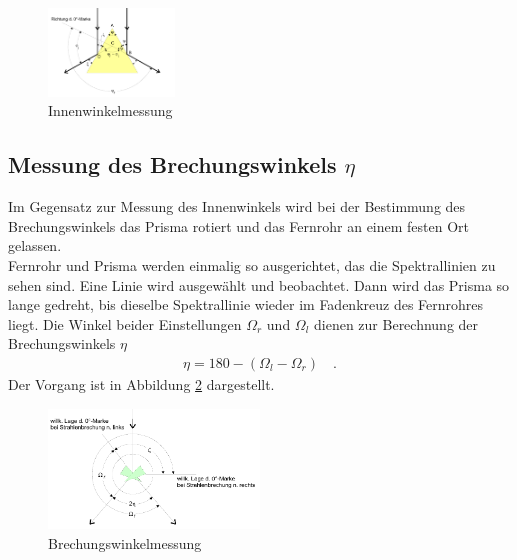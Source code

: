 \begin{figure}[h!]
	\centering
	\includegraphics[width=0.3\textwidth]{Prisma2.png}
	\caption{Innenwinkelmessung}
	\label{fig:prisma2}
\end{figure}

\subsection{Messung des Brechungswinkels $\eta$}
Im Gegensatz zur Messung des Innenwinkels wird bei der Bestimmung des Brechungswinkels das Prisma rotiert und das Fernrohr an einem festen Ort gelassen. \\
Fernrohr und Prisma werden einmalig so ausgerichtet, das die Spektrallinien zu sehen sind. Eine Linie wird ausgewählt und beobachtet. Dann wird das Prisma so lange gedreht, bis dieselbe Spektrallinie wieder im Fadenkreuz des Fernrohres liegt. Die Winkel beider Einstellungen $\Omega_r$ und $\Omega_l$ dienen zur Berechnung der Brechungswinkels $\eta$
\begin{align}
	\eta = 180 - (\Omega_l - \Omega_r) \quad .
\end{align}
Der Vorgang ist in Abbildung \ref{fig:prisma3} dargestellt.

\begin{figure}[h!]
	\centering
	\includegraphics[width=0.5\textwidth]{Prisma3.png}
	\caption{Brechungswinkelmessung}
	\label{fig:prisma3}
\end{figure}

